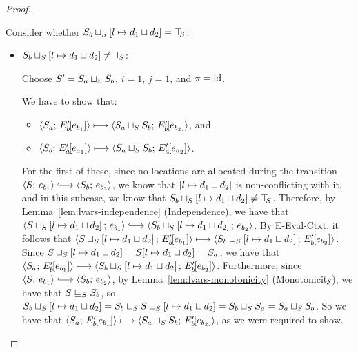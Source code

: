 \begin{proof}
\begin{enumerate}
\begin{enumerate}
      Consider whether
      $S_b \sqcup_{S} \left[ l \mapsto d_1 \sqcup d_2 \right]
      = \top\hspace{-0.85mm}_{S}$:

      \begin{itemize}
      \item
        $S_b \sqcup_{S} \left[ l \mapsto d_1 \sqcup d_2 \right]
        \neq \top\hspace{-0.85mm}_{S}$:

        Choose $S' = S_a \sqcup_{S} S_b$, $i = 1$, $j = 1$, and $\pi =
        \mathrm{id}$.

        We have to show that:
        \begin{itemize}
        \item $\langle S_a;\, E'_b\hspace{-1mm}\left[e_{b_1}\right] \rangle \longmapsto
          \langle S_a \sqcup_{S} S_b;\, E'_b\hspace{-1mm}\left[e_{b_2}\right] \rangle$, and
        \item $\langle S_b;\, E'_a\hspace{-1mm}\left[e_{a_1}\right] \rangle \longmapsto
          \langle S_a \sqcup_{S} S_b;\, E'_a\hspace{-1mm}\left[e_{a_2}\right] \rangle$.
        \end{itemize}

        For the first of these, since no locations are allocated
        during the transition $\config{S}{e_{b_1}} \parstepsto
        \config{S_b}{e_{b_2}}$, we know that
        $\left[ l \mapsto d_1 \sqcup d_2 \right]$ is
        non-conflicting with it, and in this subcase, we know that
        $S_b \sqcup_{S} \left[ l \mapsto d_1 \sqcup d_2 \right]
        \neq \top\hspace{-0.85mm}_{S}$.  Therefore, by Lemma~\ref{lem:lvars-independence}
        (Independence), we have that
        $\config{\lubstore{S}{\store{\storebindingRaw{l}{\userlub{d_1}{d_2}}}}}{e_{b_1}}
        \parstepsto
        \config{\lubstore{S_b}{\store{\storebindingRaw{l}{\userlub{d_1}{d_2}}}}}{e_{b_2}}$.
        By {\sc E-Eval-Ctxt}, it follows that
        $\langle S \sqcup_{S} \left[ l \mapsto d_1 \sqcup d_2 \right];\, E'_b\hspace{-1mm}\left[e_{b_1}\right] \rangle
        \longmapsto
        \langle S_b \sqcup_{S} \left[ l \mapsto d_1 \sqcup d_2 \right];\, E'_b\hspace{-1mm}\left[e_{b_2}\right] \rangle$.
        Since
        $S \sqcup_{S} \left[ l \mapsto d_1 \sqcup d_2 \right]
        = S[l \mapsto d_1 \sqcup d_2] = S_a$, we have that
        $\langle S_a;\, E'_b\hspace{-1mm}\left[e_{b_1}\right] \rangle \longmapsto
        \langle S_b \sqcup_{S} \left[ l \mapsto d_1 \sqcup d_2 \right];\, E'_b\hspace{-1mm}\left[e_{b_2}\right] \rangle$.
        Furthermore, since $\config{S}{e_{b_1}} \parstepsto
        \config{S_b}{e_{b_2}}$, by Lemma~\ref{lem:lvars-monotonicity}
        (Monotonicity), we have that $S \sqsubseteq_S S_b$, so
        $S_b \sqcup_{S} \left[ l \mapsto d_1 \sqcup d_2 \right]
        =
        S_b \sqcup_{S} S \sqcup_{S} \left[ l \mapsto d_1 \sqcup d_2 \right]
        = S_b \sqcup_{S} S_a = S_a \sqcup_{S} S_b$.  So we have that
        $\langle S_a;\, E'_b\hspace{-1mm}\left[e_{b_1}\right] \rangle \longmapsto
        \langle S_a \sqcup_{S} S_b;\, E'_b\hspace{-1mm}\left[e_{b_2}\right] \rangle$, as we
        were required to show.


\end{itemize}
\end{enumerate}
\end{enumerate}
\end{proof}
